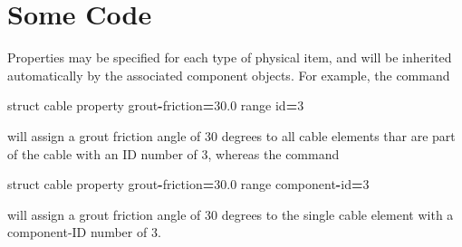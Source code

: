 \documentclass[a4paper, nobind]{templates/ociamthesis}
\newenvironment{Shaded}{\begin{snugshade}}{\end{snugshade}}
\newcommand{\BuiltInTok}[1]{#1}
\newcommand{\DecValTok}[1]{\textcolor[rgb]{0.00,0.00,0.81}{#1}}
\newcommand{\FloatTok}[1]{\textcolor[rgb]{0.00,0.00,0.81}{#1}}
\newcommand{\NormalTok}[1]{#1}
\newcommand{\OperatorTok}[1]{\textcolor[rgb]{0.81,0.36,0.00}{\textbf{#1}}}
\renewenvironment{Shaded}
{
  \vspace{10pt}%
  \begin{snugshade}%
}{%
  \end{snugshade}%
  \vspace{8pt}%
}
\begin{document}
\hypertarget{some-code}{%
\section{Some Code}\label{some-code}}

Properties may be specified for each type of physical item, and will be
inherited automatically by the associated component objects. For
example, the command

\begin{Shaded}
\begin{Highlighting}[]
\NormalTok{struct cable }\BuiltInTok{property}\NormalTok{ grout}\OperatorTok{{-}}\NormalTok{friction}\OperatorTok{=}\FloatTok{30.0} \BuiltInTok{range} \BuiltInTok{id}\OperatorTok{=}\DecValTok{3}
\end{Highlighting}
\end{Shaded}

will assign a grout friction angle of 30 degrees to all cable elements
thar are part of the cable with an ID number of 3, whereas the command

\begin{Shaded}
\begin{Highlighting}[]
\NormalTok{struct cable }\BuiltInTok{property}\NormalTok{ grout}\OperatorTok{{-}}\NormalTok{friction}\OperatorTok{=}\FloatTok{30.0} \BuiltInTok{range}\NormalTok{ component}\OperatorTok{{-}}\BuiltInTok{id}\OperatorTok{=}\DecValTok{3}
\end{Highlighting}
\end{Shaded}

will assign a grout friction angle of 30 degrees to the single cable
element with a component-ID number of 3.
\end{document}
